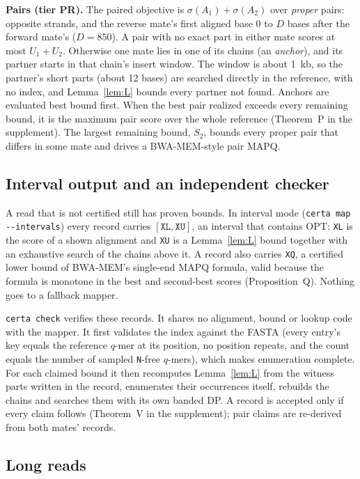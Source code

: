 \documentclass[11pt]{article}
\theoremstyle{definition}
\newcommand{\OPT}{\mathrm{OPT}}
\newcommand{\samtag}[1]{\texttt{#1}}
\begin{document}
\textbf{Pairs (tier PR).} The paired objective is $\sigma(A_1)+\sigma(A_2)$
over \emph{proper} pairs: opposite strands, and the reverse mate's first
aligned base 0 to $D$ bases after the forward mate's ($D=850$). A pair with
no exact part in either mate scores at most $U_1+U_2$. Otherwise one mate
lies in one of its chains (an \emph{anchor}), and its partner starts in
that chain's insert window. The window is about 1~kb, so the partner's
short parts (about 12 bases) are searched directly in the reference, with
no index, and Lemma~\ref{lem:L} bounds every partner not found. Anchors are
evaluated best bound first. When the best pair realized exceeds every
remaining bound, it is the maximum pair score over the whole reference
(Theorem~P in the supplement). The largest remaining bound, $S_2$, bounds
every proper pair that differs in some mate and drives a BWA-MEM-style pair
MAPQ.

\subsection{Interval output and an independent checker}\label{sec:intervals}

A read that is not certified still has proven bounds. In interval mode
(\texttt{certa map -{}-intervals}) every record carries $[\samtag{XL},\samtag{XU}]$,
an interval that contains $\OPT$: \samtag{XL} is the score of a shown
alignment and \samtag{XU} is a Lemma~\ref{lem:L} bound together with an
exhaustive search of the chains above it. A record also carries \samtag{XQ},
a certified lower bound of BWA-MEM's single-end MAPQ formula, valid
because the formula is monotone in the best and second-best scores
(Proposition~Q). Nothing goes to a fallback mapper.

\texttt{certa check} verifies these records. It shares no alignment,
bound or lookup code with the mapper. It first validates the index against
the FASTA (every entry's key equals the reference $q$-mer at its position,
no position repeats, and the count equals the number of sampled
\texttt{N}-free $q$-mers), which makes enumeration complete. For each
claimed bound it then recomputes Lemma~\ref{lem:L} from the witness parts
written in the record, enumerates their occurrences itself, rebuilds the
chains and searches them with its own banded DP. A record is accepted only
if every claim follows (Theorem~V in the supplement); pair claims are
re-derived from both mates' records.

\subsection{Long reads}\label{sec:long}
\end{document}
